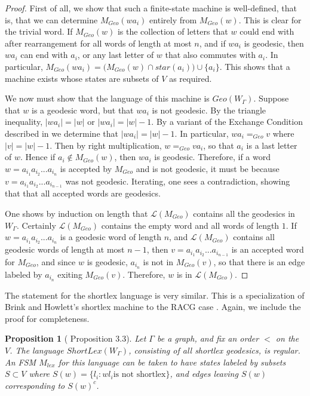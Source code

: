 \documentclass[10pt,a4paper]{amsart}
\newtheorem{proposition}[theorem]{Proposition}
\theoremstyle{definition}
\theoremstyle{remark}
\begin{document}
	\begin{proof}
		
		First of all, we show that such a finite-state machine is well-defined, that is, that we can determine $M_{Geo}(wa_i)$ entirely from $M_{Geo}(w)$. This is clear for the trivial word. If $M_{Geo}(w)$ is the collection of letters that $w$ could end with after rearrangement for all words of length at most $n$, and if $wa_i$ is geodesic, then $wa_i$ can end with $a_i$, or any last letter of $w$ that also commutes with $a_i$. In particular, $M_{Geo}(wa_i)=\bigl(M_{Geo}(w)\cap star(a_i)\bigr)\cup\{a_i\}$. This shows that a machine exists whose states are subsets of $V$ as required.
		
		We now must show that the language of this machine is $Geo(W_\Gamma)$. Suppose that $w$ is a geodesic word, but that $wa_i$ is not geodesic. By the triangle inequality, $|wa_i|=|w|$ or $|wa_i|=|w|-1$. By a variant of the Exchange Condition described in \cite{Davis} we determine that $|wa_i|=|w|-1$. In particular, $wa_i=_{Geo}v$ where $|v|=|w|-1$. Then by right multiplication, $w=_{Geo}va_i$, so that $a_i$ is a last letter of $w$. Hence if $a_i\not\in M_{Geo}(w)$, then $wa_i$ is geodesic. Therefore, if a word $w=a_{i_1}a_{i_2}...a_{i_n}$ is accepted by $M_{Geo}$ and is not geodesic, it must be because $v=a_{i_1}a_{i_2}...a_{i_{n-1}}$ was not geodesic. Iterating, one sees a contradiction, showing that that all accepted words are geodesics. 
		
		One shows by induction on length that  $\mathscr{L}(M_{Geo})$ contains all the geodesics in $W_\Gamma$. Certainly $\mathscr{L}(M_{Geo})$ contains the empty word and all words of length $1$. If $w=a_{i_1}a_{i_2}...a_{i_n}$ is a geodesic word of length $n$, and $\mathscr{L}(M_{Geo})$ contains all geodesic words of length at most $n-1$, then $v=a_{i_1}a_{i_2}...a_{i_{n-1}}$ is an accepted word for $M_{Geo}$, and since $w$ is geodesic, $a_{i_n}$ is not in $M_{Geo}(v)$, so that there is an edge labeled by $a_{i_n}$ exiting $M_{Geo}(v)$. Therefore, $w$ is in $\mathscr{L}(M_{Geo})$. 
	 \end{proof}
	
	The statement for the shortlex language is very similar. This is a specialization of Brink and Howlett's shortlex machine to the RACG case \cite{BrinkHowlett}. Again, we include the proof for completeness.
	
	\begin{proposition} [\cite{BrinkHowlett} Proposition 3.3]
		
		Let $\Gamma$ be a graph, and fix an order $<$ on the $V$. The language $ShortLex(W_\Gamma)$, consisting of all shortlex geodesics, is regular. An FSM $M_{lex}$ for this language can be taken to have states labeled by subsets $S\subset V$ where $S(w)=\{l_i: wl_i \text{is not shortlex}\}$, and edges leaving $S(w)$ corresponding to $S(w)^c$.
		
	\end{proposition}
	
\end{document}
